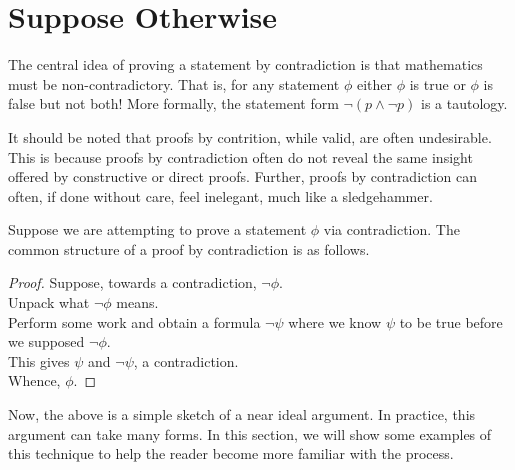\section{Suppose Otherwise}



The central idea of proving a statement by contradiction is that mathematics must be non-contradictory.
That is, for any statement $\phi$ either $\phi$ is true or $\phi$ is false but not both!
More formally, the statement form $\neg(p\wedge\neg p)$ is a tautology.

It should be noted that proofs by contrition, while valid, are often undesirable.
This is because proofs by contradiction often do not reveal the same insight offered by constructive or direct proofs.
Further, proofs by contradiction can often, if done without care, feel inelegant, much like a sledgehammer.

Suppose we are attempting to prove a statement $\phi$ via contradiction.
The common structure of a proof by contradiction is as follows.
\begin{proof}
  Suppose, towards a contradiction, $\neg\phi$.\\
  Unpack what $\neg\phi$ means.\\
  Perform some work and obtain a formula $\neg\psi$ where we know $\psi$ to be true before we supposed $\neg\phi$.\\
  This gives $\psi$ and $\neg\psi$, a contradiction.\\
  Whence, $\phi$.
\end{proof}
Now, the above is a simple sketch of a near ideal argument.
In practice, this argument can take many forms.
In this section, we will show some examples of this technique to help the reader become more familiar with the process.




